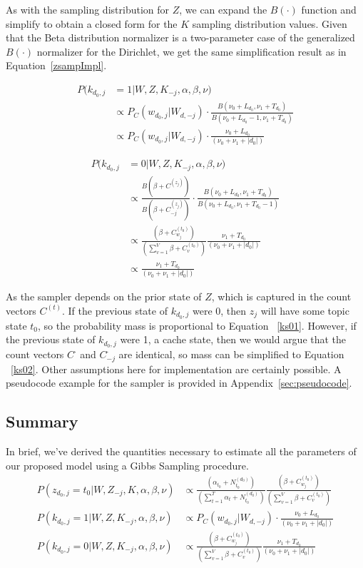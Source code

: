 As with the sampling distribution for $Z$, we can expand the $B(\cdot)$ function and simplify to obtain a closed form for the $K$ sampling distribution values.  Given that the Beta distribution normalizer is a two-parameter case of the generalized $B(\cdot)$ normalizer for the Dirichlet, we get the same simplification result as in Equation~\ref{zsampImpl}.

\begin{align}
P(k_{d_0,j}&=1|W,Z,K_{-j},\alpha,\beta,\nu)  \\
& \propto P_C(w_{d_0,j}|W_{d,-j})\cdot \frac{B(\nu_0+L_{d_0},\nu_1+T_{d_0})}{B(\nu_0+L_{d_0} - 1,\nu_1+T_{d_0})} \\
& \propto P_C(w_{d_0,j}|W_{d,-j})\cdot\frac{\nu_0 + L_{d_0}}{(\nu_0+\nu_1 + |d_0|)}
\end{align}

\begin{align}
P(k_{d_0,j}&=0|W,Z,K_{-j},\alpha,\beta,\nu)  \\
&\propto \frac{B(\beta + C^{(z_j)})}{B(\beta + C^{(z_j)}_{-j})} \cdot \frac{B(\nu_0+L_{d_0},\nu_1+T_{d_0})}{B(\nu_0+L_{d_0},\nu_1+T_{d_0} - 1)}  \\
& \propto 
\frac{(\beta +C^{(t_0)}_{w_j})}{\left(\sum_{v=1}^V \beta+C^{(t_0)}_{v} \right)} \frac{\nu_1 + T_{d_0}}{(\nu_0+\nu_1 + |d_0|)} \label{ks01}\\
& \propto 
\frac{\nu_1 + T_{d_0}}{(\nu_0+\nu_1 + |d_0|)} \label{ks02}
\end{align}

As the sampler depends on the prior state of $Z$, which is captured in the count vectors $C^{(t)}$.  If the previous state of $k_{d_0,j}$ were 0, then  $z_{j}$ will have some topic state $t_0$, so the probability mass is proportional to Equation ~\ref{ks01}.  However, if the previous state of $k_{d_0,j}$ were 1, a cache state, then we would argue that the count vectors  $C^{\cdot}$ and $C^{\cdot}_{-j}$ are identical, so mass can be simplified to Equation ~\ref{ks02}.  Other assumptions here for implementation are certainly possible.   A pseudocode example for the sampler is provided in Appendix~\ref{sec:pseudocode}.

\subsection{Summary}

In brief, we've derived the quantities necessary to estimate all the parameters of our proposed model using a Gibbs Sampling procedure.   
\begin{align}
P(z_{d_0,j}=t_0|W,Z_{-j},K,\alpha,\beta,\nu) &\propto \frac{(\alpha_{t_0}+N^{(d_0)}_{t_0})}{\left(\sum_{t=1}^T \alpha_{t}+N^{(d_0)}_{t_0} \right)} \frac{(\beta +C^{(t_0)}_{w_j})}{\left(\sum_{v=1}^V \beta+C^{(t_0)}_{v} \right)} \label{eqn5:zsampFinal} \\
P(k_{d_0,j}=1|W,Z,K_{-j},\alpha,\beta,\nu) &\propto P_C(w_{d_0,j}|W_{d,-j})\cdot\frac{\nu_0 + L_{d_0}}{(\nu_0+\nu_1 + |d_0|)} \label{eqn5:ksampImpl}\\
P(k_{d_0,j}=0|W,Z,K_{-j},\alpha,\beta,\nu) &\propto 
\frac{(\beta +C^{(t_0)}_{w_j})}{\left(\sum_{v=1}^V \beta+C^{(t_0)}_{v} \right)} \frac{\nu_1 + T_{d_0}}{(\nu_0+\nu_1 + |d_0|)}  
\end{align}

